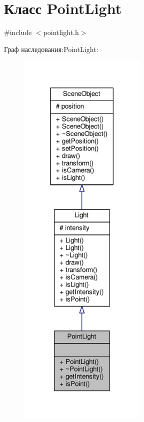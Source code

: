 \hypertarget{class_point_light}{}\section{Класс Point\+Light}
\label{class_point_light}


{\ttfamily \#include $<$pointlight.\+h$>$}



Граф наследования\+:Point\+Light\+:
\nopagebreak
\begin{figure}[H]
\begin{center}
\leavevmode
\includegraphics[width=174pt]{d0/d65/class_point_light__inherit__graph}
\end{center}
\end{figure}


